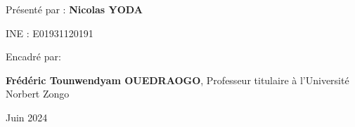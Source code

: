 \begin{titlepage}
\begin{center}
\begin{tcolorbox}
\begin{center}
\end{center}
\end{tcolorbox}

\vspace{30pt}

{\fontsize{16}{1}\selectfont Présenté par : \textbf{Nicolas YODA}}
\begin{center}
INE : E01931120191
\end{center}
\end{center}

\vspace{30pt}
{\fontsize{16}{1}\selectfont Encadré par:}\\
\vspace{2pt}

{\fontsize{14}{1}\selectfont \textbf{Frédéric Tounwendyam OUEDRAOGO}}, Professeur titulaire à l'Université Norbert Zongo\\

\vspace{20pt}

\begin{center}
Juin 2024
\end{center}
\end{titlepage}
